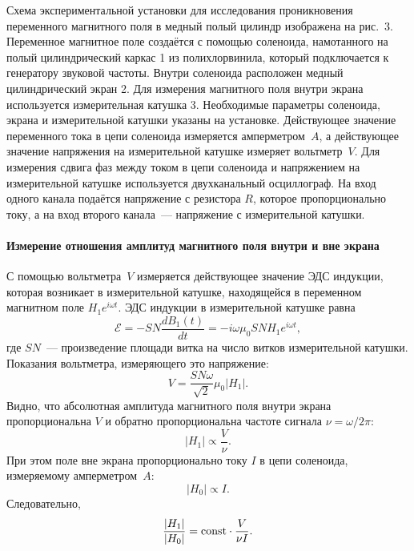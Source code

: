 



\experiment
Схема экспериментальной установки для исследования проникновения переменного магнитного поля в медный полый цилиндр
изображена на рис.~3. Переменное магнитное поле создаётся с помощью соленоида, намотанного на полый цилиндрический каркас 1
из полихлорвинила, который подключается к генератору звуковой частоты. Внутри соленоида расположен медный цилиндрический
экран 2. Для измерения магнитного поля внутри экрана используется измерительная катушка 3. Необходимые параметры
соленоида, экрана и измерительной катушки указаны на установке. Действующее значение переменного тока в цепи соленоида
измеряется амперметром~$A$, а действующее значение напряжения 
на измерительной катушке измеряет вольтметр~$V$. Для измерения сдвига фаз между током в цепи соленоида и напряжением на измерительной катушке
используется двухканальный осциллограф. На вход одного канала подаётся напряжение с резистора $R$, которое
пропорционально току, а на вход второго канала~--- напряжение с измерительной катушки.

\paragraph{Измерение отношения амплитуд магнитного поля внутри и вне экрана}

С помощью вольтметра~$V$ измеряется действующее значение ЭДС индукции, 
которая возникает в измерительной катушке, находящейся в переменном магнитном поле
$H_1e^{i\omega t}$.
ЭДС индукции в измерительной катушке равна
\[
\mathcal{E}=-SN\frac{dB_{1}(t)}{dt}=-i\omega \mu_0 S N H_1 e^{i\omega t},
\]
где $SN$~--- произведение площади витка на число витков измерительной катушки. 
Показания вольтметра, измеряющего это напряжение: 
\[
V= \frac{SN\omega}{\sqrt{2}}\mu_0|H_1|.
\]
Видно, что абсолютная амплитуда магнитного поля внутри экрана пропорциональна
$V$ и обратно пропорциональна частоте сигнала $\nu = \omega / 2\pi$:
\[
|H_1|\propto \frac{V}{\nu}.
\]
При этом поле вне экрана пропорционально току $I$ в цепи соленоида,
измеряемому амперметром~$A$:
\[
|H_0| \propto I.
\] 
Следовательно, 
\begin{equation} \eqmark{H1H0exp}
\frac{|H_1|}{|H_0|} = \const \cdot \frac{V}{\nu I}.
\end{equation}

